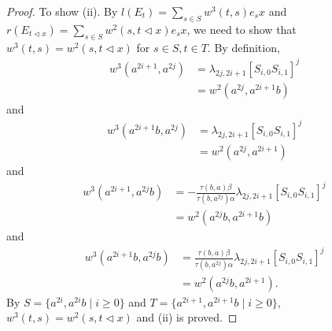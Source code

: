 \documentclass[a4paper,11pt]{amsart}
\numberwithin{equation}{section}
\begin{document}
\begin{proof}
To show (ii). By $l(E_t)=\sum_{s\in S} w^3(t,s)e_s x$ and $r(E_{t\triangleleft x})=\sum_{s\in S} w^2(s,t \triangleleft x)e_s x$,  we need to show that $w^3(t,s)=w^2(s,t\triangleleft x)$ for $s\in S,t\in T.$  By definition,
\begin{align*}
w^3(a^{2i+1},a^{2j})&=\lambda_{2j,2i+1} [S_{i,0}S_{i,1}]^j\\
&=w^2(a^{2j},a^{2i+1}b)
\end{align*}
and
\begin{align*}
w^3(a^{2i+1}b,a^{2j})&=\lambda_{2j,2i+1} [S_{i,0}S_{i,1}]^j\\
&=w^2(a^{2j},a^{2i+1})
\end{align*}
and
\begin{align*}
w^3(a^{2i+1},a^{2j}b)&=-\frac{\tau(b,a) \beta}{\tau(b,a^{2j}) \alpha}\lambda_{2j,2i+1} [S_{i,0}S_{i,1}]^j\\
&=w^2(a^{2j}b,a^{2i+1}b)
\end{align*}
and
\begin{align*}
w^3(a^{2i+1}b,a^{2j}b)&=\frac{\tau(b,a) \beta}{\tau(b,a^{2j}) \alpha}\lambda_{2j,2i+1} [S_{i,0}S_{i,1}]^j\\
&=w^2(a^{2j}b,a^{2i+1}).
\end{align*}
 By $S=\{a^{2i},a^{2i}b\;|\;i\geq 0\}$ and $T=\{a^{2i+1},a^{2i+1}b\;|\;i\geq 0\}$,  $w^3(t,s)=w^2(s,t\triangleleft x)$ and (ii) is proved.



\end{proof}
\end{document}
